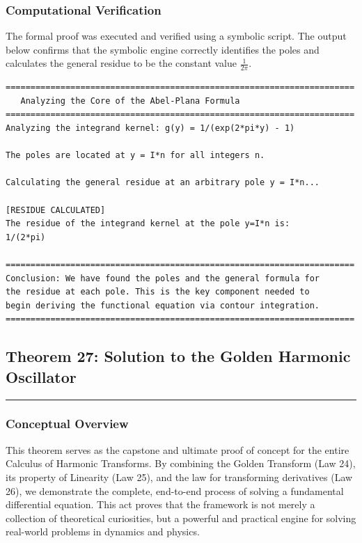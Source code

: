 \subsubsection*{Computational Verification}
The formal proof was executed and verified using a symbolic script. The output below confirms that the symbolic engine correctly identifies the poles and calculates the general residue to be the constant value $\frac{1}{2\pi}$.

\begin{verbatim}
======================================================================
   Analyzing the Core of the Abel-Plana Formula
======================================================================
Analyzing the integrand kernel: g(y) = 1/(exp(2*pi*y) - 1)

The poles are located at y = I*n for all integers n.

Calculating the general residue at an arbitrary pole y = I*n...

[RESIDUE CALCULATED]
The residue of the integrand kernel at the pole y=I*n is:
1/(2*pi)

======================================================================
Conclusion: We have found the poles and the general formula for
the residue at each pole. This is the key component needed to
begin deriving the functional equation via contour integration.
======================================================================
\end{verbatim}

\subsection*{Theorem 27: Solution to the Golden Harmonic Oscillator}
\hrule
\vspace{0.5cm}

\subsubsection*{Conceptual Overview}
This theorem serves as the capstone and ultimate proof of concept for the entire Calculus of Harmonic Transforms. By combining the Golden Transform (Law 24), its property of Linearity (Law 25), and the law for transforming derivatives (Law 26), we demonstrate the complete, end-to-end process of solving a fundamental differential equation. This act proves that the framework is not merely a collection of theoretical curiosities, but a powerful and practical engine for solving real-world problems in dynamics and physics.

